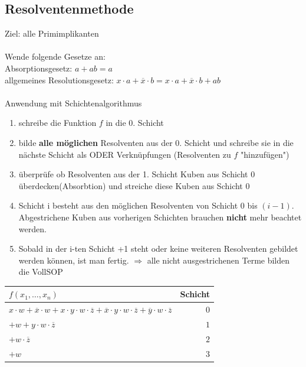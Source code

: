 \documentclass[6pt,a4paper]{scrartcl}
\newcommand{\Ra}[0]{\ensuremath{\Rightarrow}}									%
\begin{document}
\begin{multicols*}{3}
	\subsection{Resolventenmethode} %
	\label{sec:Resolventenmethode}
		Ziel: alle Primimplikanten \\ \\
		Wende folgende Gesetze an: \\
		Absorptionsgesetz: $a + ab = a$ \\
		allgemeines Resolutionsgesetz: $x \cdot a + \overline x \cdot b = x \cdot a + \overline x \cdot b + ab$ \\
		\\
		Anwendung mit Schichtenalgorithmus
		\begin{enumerate}
			\item schreibe die Funktion $f$ in die 0. Schicht
			\item bilde \textbf{alle möglichen} Resolventen aus der 0. Schicht und schreibe sie in die nächste Schicht als ODER Verknüpfungen (Resolventen zu $f$ "hinzufügen")
			\item überprüfe ob Resolventen aus der 1. Schicht Kuben aus Schicht 0 überdecken(Absorbtion) und streiche diese Kuben aus Schicht 0
			\item Schicht i besteht aus den möglichen Resolventen von Schicht 0 bis $(i-1)$. Abgestrichene Kuben aus vorherigen Schichten brauchen \textbf{nicht} mehr beachtet werden.
			\item Sobald in der i-ten Schicht +1 steht oder keine weiteren Resolventen gebildet werden können, ist man fertig. 
			$\Ra $ alle nicht ausgestrichenen Terme bilden die VollSOP
		\end{enumerate}
		
		\begin{tabular}{l | r}
		$f(x_1, \ldots, x_n)$ & Schicht \\ \midrule
		$x \cdot w + \overline x \cdot w + x \cdot y \cdot w \cdot \overline z + \overline x \cdot y \cdot w \cdot \overline z + \overline y \cdot w \cdot \overline z $& $0$ \\
		$+ w + y \cdot w \cdot \overline z$ & $1$ \\
		$+ w \cdot \overline z $ & $2$ \\
		$+ w$ &$ 3$
		\end{tabular}


\end{multicols*}
\end{document}
